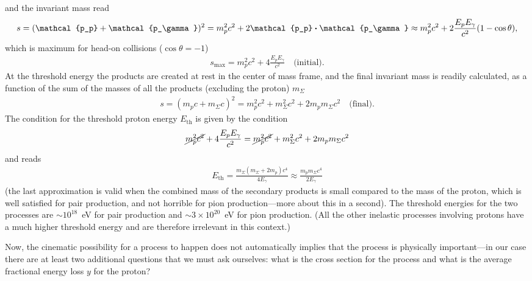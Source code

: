 and the invariant mass read
\begin{align*}
  s = (\mathcal{p_p} + \mathcal{p_\gamma})^2 =
  m_p^2 c^2 + 2 \mathcal{p_p} \dotproduct \mathcal{p_\gamma} \approx
  m_p^2 c^2 + 2 \frac{E_p E_\gamma}{c^2} (1 - \cos\theta),
\end{align*}
which is maximum for head-on collisions ($\cos\theta = -1$)
\begin{align*}
  s_\text{max} = m_p^2 c^2 + 4 \frac{E_p E_\gamma}{c^2} \quad\text{(initial)}.
\end{align*}
At the threshold energy the products are created at rest in the center of mass
frame, and the final invariant mass is readily calculated, as a function of the
sum of the masses of all the products (excluding the proton) $m_\Sigma$
\begin{align*}
  s = (m_p c + m_\Sigma c)^2 =
  m_p^2 c^2 + m_\Sigma^2 c^2 + 2 m_p m_\Sigma c^2 \quad\text{(final)}.
\end{align*}
The condition for the threshold proton energy $E_\text{th}$ is given by the condition
\begin{align*}
  \cancel{m_p^2 c^2} + 4 \frac{E_p E_\gamma}{c^2} =
  \cancel{m_p^2 c^2} + m_\Sigma^2c^2 + 2 m_p m_\Sigma c^2
\end{align*}
and reads
\begin{align}
  E_\text{th} = \frac{m_\Sigma (m_\Sigma + 2 m_p) c^4}{4E_\gamma} \approx
  \frac{m_p m_\Sigma c^4}{2E_\gamma}
\end{align}
(the last approximation is valid when the combined mass of the secondary products
is small compared to the mass of the proton, which is well satisfied for pair
production, and not horrible for pion production---more about this in a second).
The threshold energies for the two processes are $\sim 10^{18}$~eV for pair production
and $\sim 3 \times 10^{20}$~eV for pion production. (All the other inelastic processes
involving protons have a much higher threshold energy and are therefore irrelevant
in this context.)

Now, the cinematic possibility for a process to happen does not automatically implies
that the process is physically important---in our case there are at least two
additional questions that we must ask ourselves: what is the cross section for the
process and what is the average fractional energy loss $y$ for the proton?

